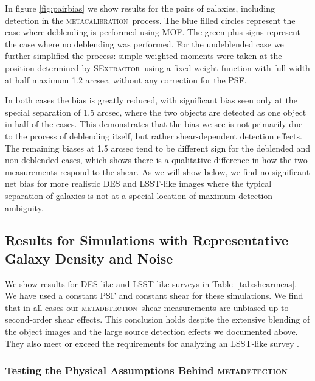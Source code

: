 \documentclass[fleqn,useAMS,usenatbib]{mnras}
\newcommand{\mcal}{\textsc{metacalibration}}
\newcommand{\mdet}{\textsc{metadetection}}
\newcommand{\sx}{\textsc{SExtractor}}
\begin{document}
In figure \ref{fig:pairbias} we show results for the pairs of galaxies, including
detection in the \mcal\ process. The blue filled circles represent the case
where deblending is performed using MOF. The green plus signs represent the
case where no deblending was performed. For the undeblended case we further
simplified the process: simple weighted moments were taken at the position
determined by \sx\ using a fixed weight function with full-width at half
maximum 1.2 arcsec, without any correction for the PSF.

In both cases the bias is greatly reduced, with significant bias seen only at
the special separation of 1.5 arcsec, where the two objects are detected as one
object in half of the cases. This demonstrates that the bias we see is not
primarily due to the process of deblending itself, but rather shear-dependent
detection effects. The remaining biases at 1.5 arcsec tend to be different sign
for the deblended and non-deblended cases, which shows there is a qualitative
difference in how the two measurements respond to the shear. As we will show
below, we find no significant net bias for more realistic DES and LSST-like
images where the typical separation of galaxies is not at a special location of
maximum detection ambiguity.

\subsection{Results for Simulations with Representative Galaxy Density and Noise}
\label{sec:res:constpsf}

We show results for DES-like and LSST-like surveys in Table~\ref{tab:shearmeas}.
We have used a constant PSF and constant shear for these simulations. We find
that in all cases our \mdet\ shear measurements are unbiased up to
second-order shear effects. This conclusion holds despite the extensive blending
of the object images and the large source detection effects we documented
above. They also meet or exceed the requirements for analyzing an LSST-like survey
\citep[e.g.,][]{huterer2006}.

\subsubsection{Testing the Physical Assumptions Behind \mdet}
\end{document}
